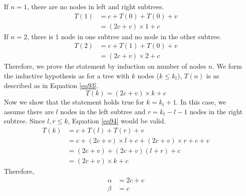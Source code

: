 If $n = 1$, there are no nodes in left and right subtrees.
\begin{equation}
\begin{aligned}
T(1) &= c + T(0) + T(0) + v\\
&= (2c + v) \times 1 + c
\end{aligned}
\end{equation}
If $n = 2$, there is 1 node in one subtree and no node in the other subtree.
\begin{equation}
\begin{aligned}
T(2) &= c + T(1) + T(0) + v\\
&= (2c + v) \times 2 + c
\end{aligned}
\end{equation}
Therefore, we prove the statement by induction on number of nodes $n$.
We form the inductive hypothesis as for a tree with $k$ nodes ($k \leq k_t$), $T(n)$ is as described as in Equation \ref{eq93}.
\begin{equation}
T(k) = (2c + v) \times k + c
\label{eq93}
\end{equation}
Now we show that the statement holds true for $k = k_t + 1$.
In this case, we assume there are $l$ nodes in the left subtree and $r = k_t - l - 1$ nodes in the right subtree.
Since $l, r \leq k$, Equation \ref{eq94} would be valid.
\begin{equation}
\begin{aligned}
T(k) &= c + T(l) + T(r) + v\\
&= c + (2c + v) \times l + c + (2c + v) \times r + c + v\\
&= (2c + v) + (2c + v)(l + r) + c\\
&= (2c + v) \times k + c
\end{aligned}\label{eq94}
\end{equation}
Therefore,
\begin{align}
\alpha &= 2c + v\\
\beta &= c
\end{align}\label{eq95}

